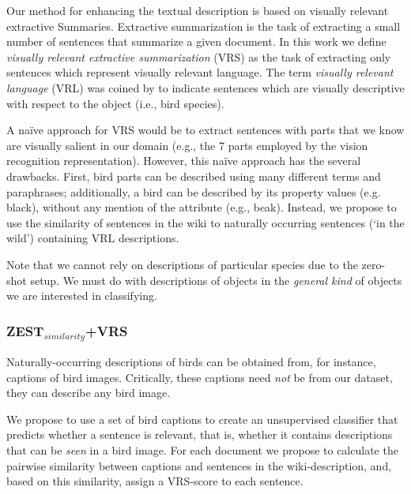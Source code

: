 \documentclass[11pt,a4paper]{article}
\newcommand\gal[1]{\textcolor{bright}{\textbf{GAL:} #1 }}
\begin{document}

Our method for enhancing the textual description is based on visually relevant extractive Summaries.
Extractive summarization is the task of extracting a small number of sentences that summarize a given document.
In this work we define {\em visually relevant extractive summarization} (VRS) as the task of extracting only sentences which represent {visually relevant} language. The term {\em visually relevant language} (VRL) was coined by \citet{winn2016detecting} to indicate sentences which are visually descriptive with respect to the object (i.e., bird species).


A {na\"{i}ve} approach for VRS would be to extract sentences with  parts that we know are visually salient in our domain (e.g., the 7 parts employed by the vision recognition representation).  However, this na\"{i}ve approach has the several drawbacks. First, bird parts can be described using many different terms and paraphrases; additionally, a bird can be described by its property values (e.g. black), without any mention of the  attribute (e.g.,  beak). 
Instead, we propose to use the similarity of sentences in the wiki to naturally occurring sentences  (`in the wild') containing VRL descriptions. %

Note that we cannot rely on descriptions of particular species due to the zero-shot setup. We must do with descriptions of objects in the  {\em  general kind} %
of objects we are interested in classifying. 

\subsubsection{ZEST$_{similarity}$+VRS}
Naturally-occurring descriptions of birds can be obtained from, for instance, captions of bird images. Critically, these captions need {\em not}  be from  our dataset, they can describe any bird image. 

We propose to use a set of bird captions to create an unsupervised classifier that predicts whether a sentence is relevant, that is, whether it contains descriptions that can be {\em seen} in a bird image.
For each document we propose to calculate the pairwise similarity between captions and sentences in the wiki-description, and, based on this similarity, assign a VRS-score to each sentence.
\end{document}
